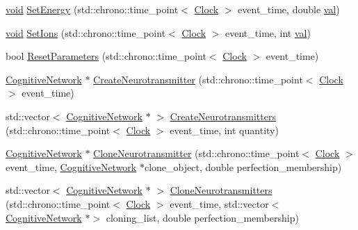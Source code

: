 \begin{DoxyCompactItemize}
\mbox{\hyperlink{glad_8h_a950fc91edb4504f62f1c577bf4727c29}{void}} \mbox{\hyperlink{class_neuroreceptor_ac1189f9c40e3cd07e4b1dc11115ad882}{Set\+Energy}} (std\+::chrono\+::time\+\_\+point$<$ \mbox{\hyperlink{universe_8h_a0ef8d951d1ca5ab3cfaf7ab4c7a6fd80}{Clock}} $>$ event\+\_\+time, double \mbox{\hyperlink{glad_8h_a26942fd2ed566ef553eae82d2c109c8f}{val}})
\item 
\mbox{\hyperlink{glad_8h_a950fc91edb4504f62f1c577bf4727c29}{void}} \mbox{\hyperlink{class_neuroreceptor_a36a548475e752631130a2b4ec67c66b6}{Set\+Ions}} (std\+::chrono\+::time\+\_\+point$<$ \mbox{\hyperlink{universe_8h_a0ef8d951d1ca5ab3cfaf7ab4c7a6fd80}{Clock}} $>$ event\+\_\+time, int \mbox{\hyperlink{glad_8h_a26942fd2ed566ef553eae82d2c109c8f}{val}})
\item 
bool \mbox{\hyperlink{class_neuroreceptor_a30debeb0311d92eb6abe354409c15d09}{Reset\+Parameters}} (std\+::chrono\+::time\+\_\+point$<$ \mbox{\hyperlink{universe_8h_a0ef8d951d1ca5ab3cfaf7ab4c7a6fd80}{Clock}} $>$ event\+\_\+time)
\item 
\mbox{\hyperlink{class_cognitive_network}{Cognitive\+Network}} $\ast$ \mbox{\hyperlink{class_neuroreceptor_af671059884336eadbc367f9d8556eb3f}{Create\+Neurotransmitter}} (std\+::chrono\+::time\+\_\+point$<$ \mbox{\hyperlink{universe_8h_a0ef8d951d1ca5ab3cfaf7ab4c7a6fd80}{Clock}} $>$ event\+\_\+time)
\item 
std\+::vector$<$ \mbox{\hyperlink{class_cognitive_network}{Cognitive\+Network}} $\ast$ $>$ \mbox{\hyperlink{class_neuroreceptor_aa0037379ecb214ff982429e054f2a194}{Create\+Neurotransmitters}} (std\+::chrono\+::time\+\_\+point$<$ \mbox{\hyperlink{universe_8h_a0ef8d951d1ca5ab3cfaf7ab4c7a6fd80}{Clock}} $>$ event\+\_\+time, int quantity)
\item 
\mbox{\hyperlink{class_cognitive_network}{Cognitive\+Network}} $\ast$ \mbox{\hyperlink{class_neuroreceptor_a5629a3d463cc963138ff017ec499720d}{Clone\+Neurotransmitter}} (std\+::chrono\+::time\+\_\+point$<$ \mbox{\hyperlink{universe_8h_a0ef8d951d1ca5ab3cfaf7ab4c7a6fd80}{Clock}} $>$ event\+\_\+time, \mbox{\hyperlink{class_cognitive_network}{Cognitive\+Network}} $\ast$clone\+\_\+object, double perfection\+\_\+membership)
\item 
std\+::vector$<$ \mbox{\hyperlink{class_cognitive_network}{Cognitive\+Network}} $\ast$ $>$ \mbox{\hyperlink{class_neuroreceptor_af953abb478f4a3a1843b4b61f9969274}{Clone\+Neurotransmitters}} (std\+::chrono\+::time\+\_\+point$<$ \mbox{\hyperlink{universe_8h_a0ef8d951d1ca5ab3cfaf7ab4c7a6fd80}{Clock}} $>$ event\+\_\+time, std\+::vector$<$ \mbox{\hyperlink{class_cognitive_network}{Cognitive\+Network}} $\ast$$>$ cloning\+\_\+list, double perfection\+\_\+membership)
$$
\end{DoxyCompactItemize}
